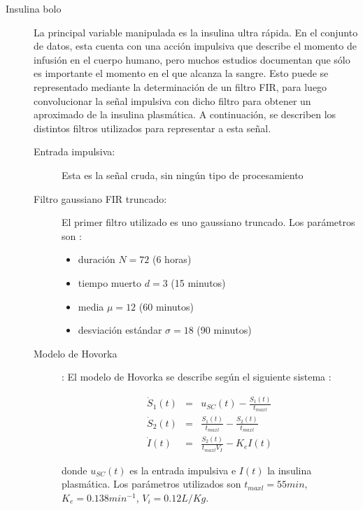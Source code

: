 \begin{description}

\item[Insulina bolo] La principal variable manipulada es la insulina ultra rápida. En el conjunto de datos, esta cuenta con una acción impulsiva que describe el momento de infusión en el cuerpo humano, pero muchos estudios documentan que sólo es importante el momento en el que alcanza la sangre. Esto puede se representado mediante la determinación de un filtro FIR, para luego convolucionar la señal impulsiva con dicho filtro para obtener un aproximado de la insulina plasmática. A continuación, se describen los distintos filtros utilizados para representar a esta señal.

\begin{description}
	\item [Entrada impulsiva:] Esta es la señal cruda, sin ningún tipo de procesamiento
	
	\item [Filtro gaussiano FIR truncado:] El primer filtro utilizado es uno gaussiano truncado. Los parámetros son \cite{xie2016nonlinear}:
	
	\begin{itemize}
		\item duración $N=72$ (6 horas)
		
		\item tiempo muerto $d=3$ (15 minutos)
		
		\item media $\mu=12$ (60 minutos)
		
		\item desviación estándar $\sigma = 18$ (90 minutos)
		
	\end{itemize}

	\item [Modelo de Hovorka]: El modelo de Hovorka se describe según el siguiente sistema \cite{bondia2018insulin}:
	
	\begin{eqnarray}
		\dot{S}_1(t) & = & u_{SC}(t) - \frac{S_1(t)}{t_{maxl}} \\
		\dot{S}_2(t) & = & \frac{S_1(t)}{t_{maxl}} - \frac{S_2(t)}{t_{maxl}} \\
		\dot{I}(t) & = & \frac{S_2(t)}{t_{maxl}V_I} - K_e I(t)
	\end{eqnarray}
	
	donde $u_{SC}(t)$ es la entrada impulsiva e $I(t)$ la insulina plasmática. Los parámetros utilizados son $t_{maxl} = 55 min$, $K_e = 0.138 min^{-1}$, $V_i = 0.12 L/Kg$.
	

\end{description}
\end{description}
